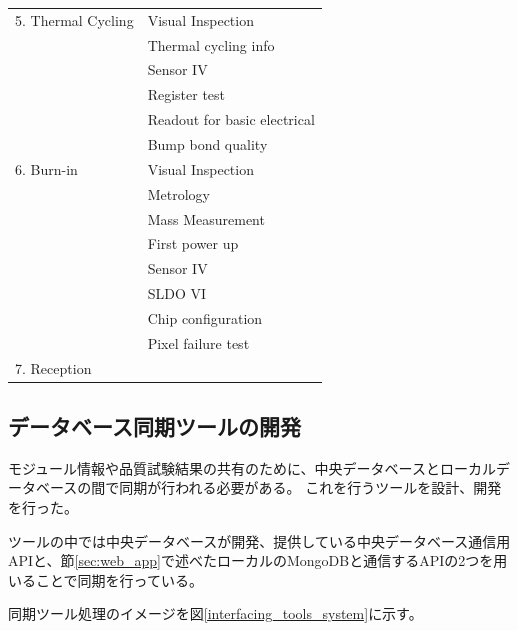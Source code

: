 \begin{table}[btp]
\begin{center}
\begin{tabular}{|ll|}
    5. Thermal Cycling      & Visual Inspection \\ 
                            & Thermal cycling info \\
                            & Sensor IV \\
                            & Register test\\
                            & Readout for basic electrical \\
                            & Bump bond quality \\\hline

    6. Burn-in              & Visual Inspection \\ 
                            & Metrology \\
                            & Mass Measurement \\
                            & First power up\\
                            & Sensor IV\\
                            & SLDO VI\\
                            & Chip configuration\\
                            & Pixel failure test\\\hline

    7. Reception            & \\\hline 
  \end{tabular}
\end{center}
\end{table}


\clearpage

\subsection{データベース同期ツールの開発} \label{sec:interfacing_tool}
モジュール情報や品質試験結果の共有のために、中央データベースとローカルデータベースの間で同期が行われる必要がある。
これを行うツールを設計、開発を行った。

ツールの中では中央データベースが開発、提供している中央データベース通信用APIと、節\ref{sec:web_app}で述べたローカルのMongoDBと通信するAPIの2つを用いることで同期を行っている。

同期ツール処理のイメージを図\ref{interfacing_tools_system}に示す。

